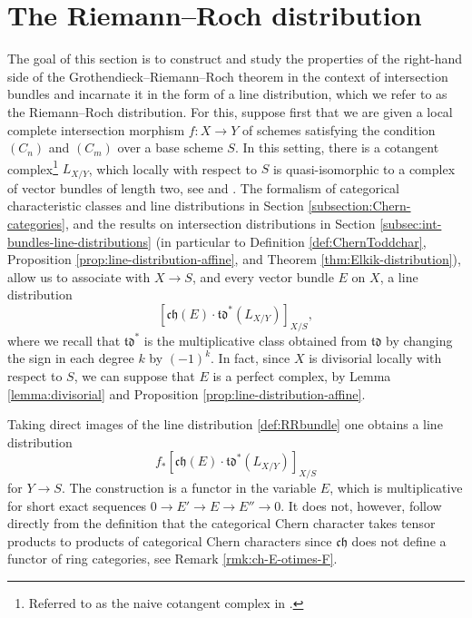\documentclass[JEP,XML,SOM,Unicode,published]{cedram}
\theoremstyle{plain}
\theoremstyle{definition}
\newcommand{\chfrak}{\mathfrak {ch}}
\newcommand{\tdfrak}{\mathfrak {td}}
\begin{document}
\section{The Riemann--Roch distribution}\label{sec:RR-distribution}
The goal of this section is to construct and study the properties of the right-hand side of the Grothendieck--Riemann--Roch theorem in the context of intersection bundles and incarnate it in the form of a line distribution, which we refer to as the Riemann--Roch distribution. For this, suppose first that we are given a local complete intersection morphism $f \colon X \to Y$ of schemes satisfying the condition $(C_n)$ and $(C_m)$ over a base scheme $S$. In this setting, there is a cotangent complex\footnote{Referred to as the naive cotangent complex in \cite[\href{https://stacks.math.columbia.edu/tag/08P5}{08P5}]{stacks-project}.} $L_{X/Y}$, which locally with respect to $S$ is quasi-isomorphic to a complex of vector bundles of length two, see \cite[\href{https://stacks.math.columbia.edu/tag/08TJ}{08TJ}]{stacks-project} and \cite[\href{https://stacks.math.columbia.edu/tag/0FV4}{0FV4}]{stacks-project}. The formalism of categorical characteristic classes and line distributions in Section \ref{subsection:Chern-categories}, and the results on intersection distributions in Section \ref{subsec:int-bundles-line-distributions} (in particular to Definition \ref{def:ChernToddchar}, Proposition \ref{prop:line-distribution-affine}, and Theorem \ref{thm:Elkik-distribution}), allow us to associate with $X\to S$, and every vector bundle $E$ on $X$, a line distribution
\begin{equation}\label{def:RRbundle}
[\chfrak(E)\cdot \tdfrak^{*}(L_{X/Y})]_{X/S},
\end{equation}
where we recall that $\tdfrak^\ast$ is the multiplicative class obtained from $\tdfrak$ by changing the sign in each degree $k$ by $(-1)^{k}$. In fact, since $X$ is divisorial locally with respect to $S$, we can suppose that $E$ is a perfect complex, by Lemma \ref{lemma:divisorial} and Proposition \ref{prop:line-distribution-affine}.

Taking direct images of the line distribution \eqref{def:RRbundle} one obtains a line distribution
\begin{equation}\label{def:RRdistribution}
f_\ast [\chfrak(E)\cdot \tdfrak^{*}(L_{X/Y})]_{X/S}
\end{equation}
for $Y\to S$. The construction is a functor in the variable $E$, which is multiplicative for short exact sequences $0 \to E' \to E \to E'' \to 0$. It does not, however, follow directly from the definition that the categorical Chern character takes tensor products to products of categorical Chern characters since $\chfrak$ does not define a functor of ring categories, see Remark \ref{rmk:ch-E-otimes-F}.
\end{document}
